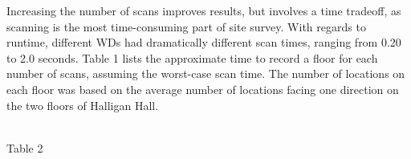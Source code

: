 \documentclass[conference]{IEEEtran}
\begin{document}
\indent Increasing the number of scans improves results, but involves a time tradeoff, as scanning is the most time-consuming part of site survey. With regards to runtime, different WDs had dramatically different scan times, ranging from 0.20 to 2.0 seconds. Table 1 lists the approximate time to record a floor for each number of scans, assuming the worst-case scan time. The number of locations on each floor was based on the average number of locations facing one direction on the two floors of Halligan Hall.\\
\vspace{5mm}\\
\begin{center}
Table 2
\end{center}
\end{document}
